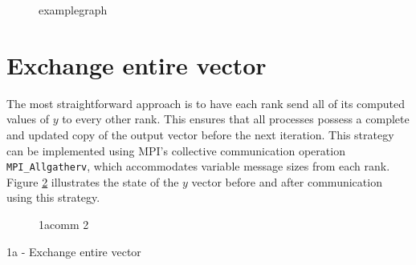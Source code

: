 \begin{figure}[ht]
    \centering
    \caption{examplegraph}
    \label{fig:examplegraph}
\end{figure}

\section{Exchange entire vector}


The most straightforward approach is to have each rank send all of its computed values of 
\(y\) to every other rank. This ensures that all processes possess a complete and updated copy of the output vector before the next iteration. This strategy can be implemented using MPI’s collective communication operation \texttt{MPI\_Allgatherv}, which accommodates variable message sizes from each rank. Figure \ref{fig:1acomm} illustrates the state of the \(y\) vector before and after communication using this strategy.



\begin{figure}[ht]
    \centering
    \caption{1acomm 2}
    \label{fig:1acomm}
\end{figure}


\begin{algorithm}[H]
    \caption{1a - Exchange entire vector}
    \SetAlgoVlined


\end{algorithm}

